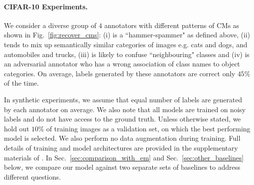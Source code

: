 

\paragraph{CIFAR-10 Experiments.} We consider a diverse group of $4$ annotators with different patterns of CMs as shown in Fig.~\ref{fig:recover_cms}: (i) is a ``hammer-spammer" as defined above, (ii) tends to mix up semantically similar categories of images e.g. cats and dogs, and automobiles and trucks, (iii) is likely to confuse ``neighbouring" classes and (iv) is an adversarial annotator who has a wrong association of class names to object categories. On average, labels generated by these annotators are correct only $45\%$ of the time.

In synthetic experiments, we assume that equal number of labels are generated by each annotator on average. We also note that all models are trained on noisy labels and do not have access to the ground truth. Unless otherwise stated, we hold out $10\%$ of training images as a validation set, on which the best performing model is selected. We also perform no data augmentation during training. Full details of training and model architectures are provided in the supplementary materials of \cite{tanno2019learning}. In Sec.~\ref{sec:comparison_with_em} and Sec.~\ref{sec:other_baselines} below, we compare our model against two separate sets of baselines to address different questions. 

